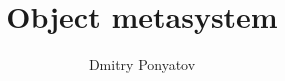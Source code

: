 
\title{{\HUGE \textbf{O}}bject metasystem}
\author{Dmitry Ponyatov }

\maketitle\clearpage
\secdown\tableofcontents\clearpage



